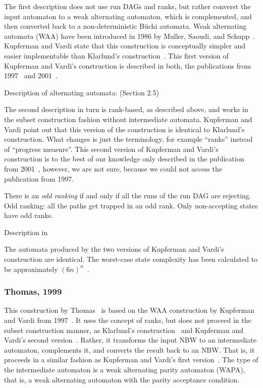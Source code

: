 The first description does not use run DAGs and ranks, but rather converst the input automaton to a weak alternating automaton, which is complemented, and then converted back to a non-deterministic Büchi automata. Weak alternating automata (WAA) have been introduced in 1986 by Muller, Saoudi, and Schupp~\cite{1986_muller}. Kupferman and Vardi state that this construction is conceptually simpler and easier implementable than Klarlund's construction~\cite{1991_klarlund}. This first version of Kupferman and Vardi's construction is described in both, the publications from 1997~\cite{1997_vardi} and 2001~\cite{Kupferman:2001}.

Description of alternating automata: \cite{1996_vardi} (Section 2.5)


The second description in turn is rank-based, as described above, and works in the subset construction fashion without intermediate automata. Kupferman and Vardi point out that this version of the construction is identical to Klarlund's construction. What changes is just the terminology, for example ``ranks'' instead of ``progress measure''. This second version of Kupferman and Vardi's construction is to the best of our knowledge only described in the publication from 2001~\cite{Kupferman:2001}, however, we are not sure, because we could not access the publication from 1997\cite{1997_vardi}.

There is an \textit{odd ranking} if and only if all the runs of the run DAG are rejecting. Odd ranking: all the paths get trapped in an odd rank. Only non-accepting states have odd ranks.

Description in \cite{fogarty2013unifying}~\cite{2007_vardi}

The automata produced by the two versions of Kupferman and Vardi's construction are identical. The worst-case state complexity has been calculated to be approximately $(6n)^n$~\cite{schewe2009buchi}\cite{2007_vardi}.

\subsubsection{Thomas, 1999}
\label{2_th99}
This construction by Thomas~\cite{1999_thomas} is based on the WAA construction by Kupferman and Vardi from 1997~\cite{1997_vardi}. It uses the concept of ranks, but does not proceed in the subset construction manner, as Klarlund's construction~\cite{1991_klarlund} and Kupferman and Vardi's second version~\cite{Kupferman:2001}. Rather, it transforms the input NBW to an intermediate automaton, complements it, and converts the result back to an NBW. That is, it proceeds in a similar fashion as Kupferman and Vardi's first version~\cite{1997_vardi}. The type of the intermediate automaton is a weak alternating parity automaton (WAPA), that is, a weak alternating automaton with the parity acceptance condition.


